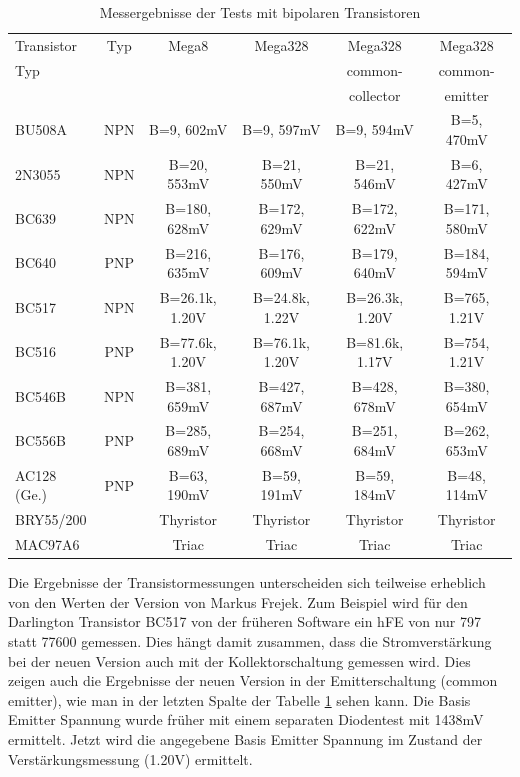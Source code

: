 \begin{table}[H]
  \begin{center}
    \begin{tabular}{| l | c | c | c | c | c |}
    \hline
 Transistor & Typ & Mega8           & Mega328        & Mega328         & Mega328 \\
    Typ     &     &                 &                & common-         & common- \\
            &     &                 &                & collector       & emitter \\
    \hline
    \hline
BU508A      & NPN & B=9, 602mV      &  B=9, 597mV    &   B=9, 594mV    & B=5, 470mV \\
    \hline
2N3055      & NPN & B=20, 553mV     &  B=21, 550mV   &   B=21, 546mV   & B=6, 427mV \\
    \hline
BC639       & NPN & B=180, 628mV    &  B=172, 629mV  &   B=172, 622mV  & B=171, 580mV \\
    \hline
BC640       & PNP & B=216, 635mV    &  B=176, 609mV  &   B=179, 640mV  & B=184, 594mV \\
    \hline
BC517       & NPN & B=26.1k, 1.20V  &  B=24.8k, 1.22V&   B=26.3k, 1.20V & B=765, 1.21V \\
    \hline
BC516       & PNP & B=77.6k, 1.20V  &  B=76.1k, 1.20V&   B=81.6k, 1.17V & B=754, 1.21V \\
    \hline
BC546B      & NPN & B=381, 659mV    &  B=427, 687mV  &   B=428, 678mV   & B=380, 654mV \\
    \hline
BC556B      & PNP & B=285, 689mV    &  B=254, 668mV  &   B=251, 684mV   & B=262, 653mV \\
    \hline
AC128 (Ge.) & PNP & B=63, 190mV     &  B=59, 191mV   &   B=59, 184mV    & B=48, 114mV \\
    \hline
BRY55/200   &     & Thyristor       & Thyristor      &  Thyristor       & Thyristor \\
    \hline
MAC97A6     &     & Triac           & Triac          &  Triac           & Triac     \\
    \hline
    \end{tabular}
  \end{center}
  \caption{Messergebnisse der Tests mit bipolaren Transistoren}
  \label{tab:bipolar} 
\end{table}

Die Ergebnisse der Transistormessungen unterscheiden sich teilweise erheblich von den Werten der Version 
von Markus Frejek. Zum Beispiel wird für den Darlington Transistor BC517 von
der früheren Software ein hFE von nur 797 statt 77600 gemessen. 
Dies hängt damit zusammen, dass die Stromverstärkung bei der neuen Version auch mit der
Kollektorschaltung gemessen wird.
Dies zeigen auch die Ergebnisse der neuen Version in der Emitterschaltung (common emitter),
wie man in der letzten Spalte der Tabelle \ref{tab:bipolar} sehen kann.
Die Basis Emitter Spannung wurde früher mit einem separaten Diodentest mit 1438mV ermittelt.
Jetzt wird die angegebene Basis Emitter Spannung im Zustand der Verstärkungsmessung (1.20V) ermittelt.

